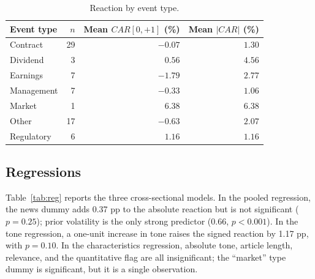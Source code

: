 \documentclass[10pt,twocolumn,a4paper]{article}
\begin{document}
\begin{table}[t]
\centering
\small
\setlength{\tabcolsep}{3.5pt}
\begin{threeparttable}
\caption{Reaction by event type.}
\label{tab:type}
\begin{tabular}{@{}lrrr@{}}
\toprule
Event type & $n$ & Mean $CAR[0,+1]$ (\%) & Mean $|CAR|$ (\%) \\
\midrule
Contract & 29 & $-0.07$ & $1.30$ \\
Dividend & 3 & $0.56$ & $4.56$ \\
Earnings & 7 & $-1.79$ & $2.77$ \\
Management & 7 & $-0.33$ & $1.06$ \\
Market & 1 & $6.38$ & $6.38$ \\
Other & 17 & $-0.63$ & $2.07$ \\
Regulatory & 6 & $1.16$ & $1.16$ \\
\bottomrule
\end{tabular}
\end{threeparttable}
\end{table}

\subsection{Regressions}

Table~\ref{tab:reg} reports the three cross-sectional models. In the pooled regression, the news dummy
adds 0.37 pp to the absolute reaction but is not significant ($p=0.25$); prior volatility is the only
strong predictor ($0.66$, $p<0.001$). In the tone regression, a one-unit increase in tone raises the
signed reaction by 1.17 pp, with $p=0.10$. In the characteristics regression, absolute tone, article
length, relevance, and the quantitative flag are all insignificant; the ``market'' type dummy is
significant, but it is a single observation.
\end{document}

